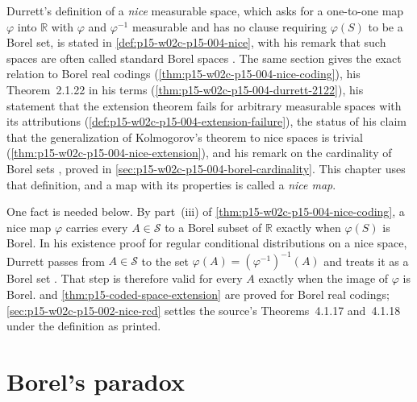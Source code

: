 Durrett's definition of a \emph{nice} measurable space, which asks for a
one-to-one map \(\varphi\) into \(\mathbb R\) with \(\varphi\) and
\(\varphi^{-1}\) measurable and has no clause requiring \(\varphi(S)\) to
be a Borel set, is stated in \cref{def:p15-w02c-p15-004-nice}, with his
remark that such spaces are often called standard Borel spaces
\cite[p.~53]{DurrettPTEAuthor2019}. The same section gives the exact
relation to Borel real codings (\cref{thm:p15-w02c-p15-004-nice-coding}),
his Theorem~2.1.22 in his terms
(\cref{thm:p15-w02c-p15-004-durrett-2122}), his statement that the
extension theorem fails for arbitrary measurable spaces with its
attributions (\cref{def:p15-w02c-p15-004-extension-failure}), the status of
his claim that the generalization of Kolmogorov's theorem to nice spaces
is trivial (\cref{thm:p15-w02c-p15-004-nice-extension}), and his remark on
the cardinality of Borel sets \cite[p.~54]{DurrettPTEAuthor2019}, proved
in \cref{sec:p15-w02c-p15-004-borel-cardinality}. This chapter uses that
definition, and a map with its properties is called a \emph{nice map}.

One fact is needed below. By part~(iii) of
\cref{thm:p15-w02c-p15-004-nice-coding}, a nice map \(\varphi\) carries
every \(A\in\mathcal S\) to a Borel subset of \(\mathbb R\) exactly when
\(\varphi(S)\) is Borel. In his existence proof for regular conditional
distributions on a nice space, Durrett passes from \(A\in\mathcal S\) to
the set \(\varphi(A)=(\varphi^{-1})^{-1}(A)\) and treats it as a Borel
set \cite[Theorem~4.1.17, p.~215]{DurrettPTEAuthor2019}. That step is
therefore valid for every \(A\) exactly when the image of \(\varphi\) is
Borel.  and
\cref{thm:p15-coded-space-extension} are proved for Borel real codings;
\cref{sec:p15-w02c-p15-002-nice-rcd} settles the source's
Theorems~4.1.17 and~4.1.18 under the definition as printed.

\section{Borel's paradox}
\label{sec:p15-w02c-p15-002-borel-paradox}

